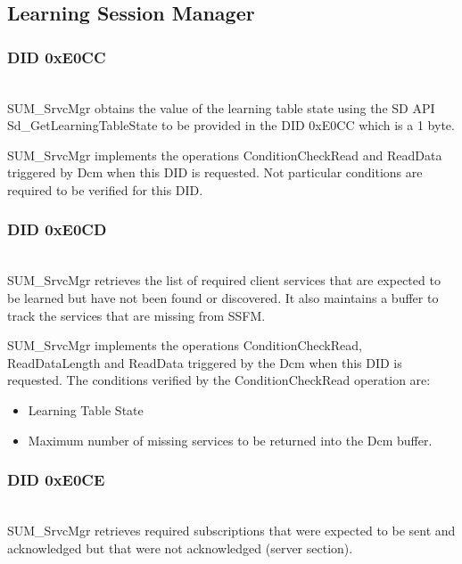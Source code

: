 {  }
\subsection{Learning Session Manager}
\subsubsection{DID 0xE0CC}
\label{sec:Ldid0xe0cc}
\\
SUM\_SrvcMgr obtains the value of the learning table state using the SD API Sd_GetLearningTableState to be provided in the DID 0xE0CC which is a 1 byte.
{}

SUM\_SrvcMgr implements the operations ConditionCheckRead and ReadData triggered by Dcm when this DID is requested. Not particular conditions are required to be verified for this DID.


\subsubsection{DID 0xE0CD}
\label{sec:didE0CD}
\\
SUM\_SrvcMgr retrieves the list of required client services that are expected to be learned but have not been found or discovered. It also maintains a buffer to track the services that are missing from SSFM.\\
{ }

SUM\_SrvcMgr implements the operations ConditionCheckRead, ReadDataLength and ReadData triggered by the Dcm when this DID is requested. The conditions verified by the ConditionCheckRead operation are:
\begin{itemize}
\item Learning Table State
\item Maximum number of missing services to be returned into the Dcm buffer.
\end{itemize}


\subsubsection{DID 0xE0CE}
\label{sec:didE0CE}
\\
SUM\_SrvcMgr retrieves required subscriptions that were expected to be sent and acknowledged but that were not acknowledged (server section).\\

